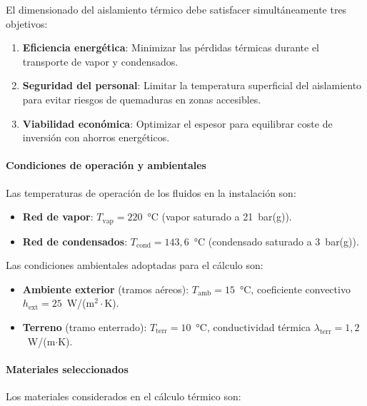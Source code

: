 El dimensionado del aislamiento térmico debe satisfacer simultáneamente tres objetivos:

\begin{enumerate}[noitemsep]
	\item \textbf{Eficiencia energética}: Minimizar las pérdidas térmicas durante el transporte de vapor y condensados.
	\item \textbf{Seguridad del personal}: Limitar la temperatura superficial del aislamiento para evitar riesgos de quemaduras en zonas accesibles.
	\item \textbf{Viabilidad económica}: Optimizar el espesor para equilibrar coste de inversión con ahorros energéticos.
\end{enumerate}

\paragraph{Condiciones de operación y ambientales}
\label{par:condiciones_operacion_aisl}

Las temperaturas de operación de los fluidos en la instalación son:

\begin{itemize}[noitemsep]
	\item \textbf{Red de vapor}: $T_{\text{vap}} = 220$~°C (vapor saturado a 21~bar(g)).
	\item \textbf{Red de condensados}: $T_{\text{cond}} = 143{,}6$~°C (condensado saturado a 3~bar(g)).
\end{itemize}

Las condiciones ambientales adoptadas para el cálculo son:

\begin{itemize}[noitemsep]
	\item \textbf{Ambiente exterior} (tramos aéreos): $T_{\text{amb}} = 15$~°C, coeficiente convectivo $h_{\text{ext}} = 25$~W/(m$^2\cdot$K).
	\item \textbf{Terreno} (tramo enterrado): $T_{\text{terr}} = 10$~°C, conductividad térmica $\lambda_{\text{terr}} = 1{,}2$~W/(m$\cdot$K).
\end{itemize}

\paragraph{Materiales seleccionados}
\label{par:materiales_aislamiento}

Los materiales considerados en el cálculo térmico son:

